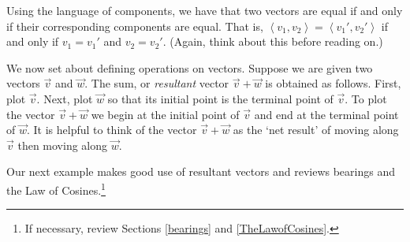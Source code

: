 \documentclass{ximera}
\begin{document}
 

Using the language of components, we have that two vectors are equal if and only if their corresponding components are equal.  That is, $\left<v_1, v_2\right> = \left<v_1', v_2'\right>$ if and only if $v_1 = v_1'$ and $v_2 = v_2'$. (Again, think about this before reading on.)  

 

We now set about defining operations on vectors.  Suppose we are given two vectors $\overrightarrow{v}$ and $\overrightarrow{w}$.  The sum, or  \textit{resultant} vector $\overrightarrow{v} + \overrightarrow{w}$ is obtained as follows.  First, plot $\overrightarrow{v}$.  Next, plot $\overrightarrow{w}$ so that its initial point is the terminal point of $\overrightarrow{v}$.  To plot the vector $\overrightarrow{v} + \overrightarrow{w}$ we begin at the initial point of $\overrightarrow{v}$ and end at the terminal point of $\overrightarrow{w}$.  It is helpful to think of the vector $\overrightarrow{v} + \overrightarrow{w}$ as the `net result' of moving along $\overrightarrow{v}$ then moving along $\overrightarrow{w}$.

\begin{center} 
\end{center}

Our next example makes good use of resultant vectors and reviews bearings and the Law of Cosines.\footnote{If necessary, review Sections \ref{bearings} and \ref{TheLawofCosines}.}  
\end{document}
